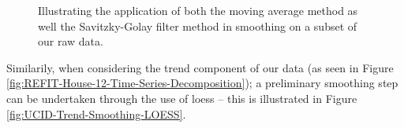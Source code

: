 \begin{adjustwidth}{-1.65cm}{-0.0cm}
\begin{enumerate}[label=Step 3.\arabic*:, leftmargin=*]
    \begin{figure}[hbt!]
        \begin{adjustwidth}{-3.0cm}{-3.0cm}%
                \myfloatalign
                 \quad
                 \quad
                \caption{Illustrating the application of both the moving average method as well the Savitzky-Golay filter method in smoothing on a subset of our raw data.}
        \end{adjustwidth}
    \end{figure}
    
    \noindent \newline Similarily, when considering the trend component of our data (as seen in Figure \ref{fig:REFIT-House-12-Time-Series-Decomposition}); a preliminary smoothing step can be undertaken through the use of \gls{loess} -- this is illustrated in Figure \ref{fig:UCID-Trend-Smoothing-LOESS}.
    

\end{enumerate}
\end{adjustwidth}
